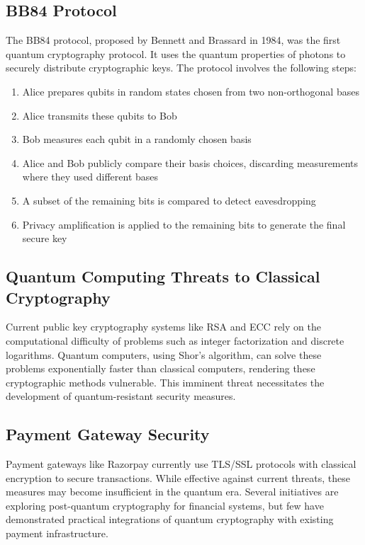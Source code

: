 \documentclass[conference]{IEEEtran}
\begin{document}
\subsection{BB84 Protocol}
The BB84 protocol, proposed by Bennett and Brassard in 1984, was the first quantum cryptography protocol. It uses the quantum properties of photons to securely distribute cryptographic keys. The protocol involves the following steps:
\begin{enumerate}
    \item Alice prepares qubits in random states chosen from two non-orthogonal bases
    \item Alice transmits these qubits to Bob
    \item Bob measures each qubit in a randomly chosen basis
    \item Alice and Bob publicly compare their basis choices, discarding measurements where they used different bases
    \item A subset of the remaining bits is compared to detect eavesdropping
    \item Privacy amplification is applied to the remaining bits to generate the final secure key
\end{enumerate}

\subsection{Quantum Computing Threats to Classical Cryptography}
Current public key cryptography systems like RSA and ECC rely on the computational difficulty of problems such as integer factorization and discrete logarithms. Quantum computers, using Shor's algorithm, can solve these problems exponentially faster than classical computers, rendering these cryptographic methods vulnerable. This imminent threat necessitates the development of quantum-resistant security measures.

\subsection{Payment Gateway Security}
Payment gateways like Razorpay currently use TLS/SSL protocols with classical encryption to secure transactions. While effective against current threats, these measures may become insufficient in the quantum era. Several initiatives are exploring post-quantum cryptography for financial systems, but few have demonstrated practical integrations of quantum cryptography with existing payment infrastructure.
\end{document}
